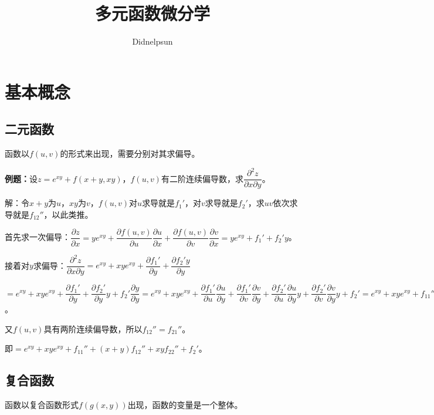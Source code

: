 \documentclass[UTF8, 12pt]{ctexart}
\author{Didnelpsun}
\title{多元函数微分学}
\date{}
\begin{document}
\maketitle
\pagestyle{empty}
\thispagestyle{empty}
\tableofcontents
\thispagestyle{empty}
\newpage
\pagestyle{plain}
\setcounter{page}{1}

\section{基本概念}

\subsection{二元函数}

函数以$f(u,v)$的形式来出现，需要分别对其求偏导。

\textbf{例题：}设$z=e^{xy}+f(x+y,xy)$，$f(u,v)$有二阶连续偏导数，求$\dfrac{\partial^2z}{\partial x\partial y}$。

解：令$x+y$为$u$，$xy$为$v$，$f(u,v)$对$u$求导就是$f_1'$，对$v$求导就是$f_2'$，求$uv$依次求导就是$f_{12}''$，以此类推。

首先求一次偏导：$\dfrac{\partial z}{\partial x}=ye^{xy}+\dfrac{\partial f(u,v)}{\partial u}\dfrac{\partial u}{\partial x}+\dfrac{\partial f(u,v)}{\partial v}\dfrac{\partial v}{\partial x}=ye^{xy}+f_1'+f_2'y$。

接着对$y$求偏导：$\dfrac{\partial^2z}{\partial x\partial y}=e^{xy}+xye^{xy}+\dfrac{\partial f_1'}{\partial y}+\dfrac{\partial f_2'y}{\partial y}$

$=e^{xy}+xye^{xy}+\dfrac{\partial f_1'}{\partial y}+\dfrac{\partial f_2'}{\partial y}y+f_2'\dfrac{\partial y}{\partial y}=e^{xy}+xye^{xy}+\dfrac{\partial f_1'}{\partial u}\dfrac{\partial u}{\partial y}+\dfrac{\partial f_1'}{\partial v}\dfrac{\partial v}{\partial y}+\dfrac{\partial f_2'}{\partial u}\dfrac{\partial u}{\partial y}y+\dfrac{\partial f_2'}{\partial v}\dfrac{\partial v}{\partial y}y+f_2'=e^{xy}+xye^{xy}+f_{11}''+f_{12}''x+f_{21}''y+f_{22}''xy+f_2'$。\medskip

又$f(u,v)$具有两阶连续偏导数，所以$f_{12}''=f_{21}''$。

即$=e^{xy}+xye^{xy}+f_{11}''+(x+y)f_{12}''+xyf_{22}''+f_2'$。

\subsection{复合函数}

函数以复合函数形式$f(g(x,y))$出现，函数的变量是一个整体。
\end{document}
